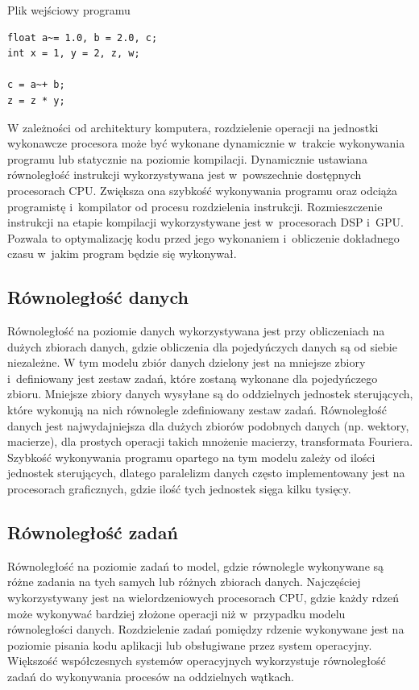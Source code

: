 \begin{program}
\caption{Plik wejściowy programu}
\begin{lstlisting}
float a~= 1.0, b = 2.0, c;
int x = 1, y = 2, z, w;

c = a~+ b;
z = z * y;
\end{lstlisting}
\end{program}

W zależności od architektury komputera, rozdzielenie operacji na jednostki wykonawcze procesora może być wykonane dynamicznie w~trakcie wykonywania programu lub statycznie na poziomie kompilacji. Dynamicznie ustawiana równoległość instrukcji wykorzystywana jest w~powszechnie dostępnych procesorach CPU. Zwiększa ona szybkość wykonywania programu oraz odciąża programistę i~kompilator od procesu rozdzielenia instrukcji. Rozmieszczenie instrukcji na etapie kompilacji wykorzystywane jest w~procesorach DSP i~GPU. Pozwala to optymalizację kodu przed jego wykonaniem i~obliczenie dokładnego czasu w~jakim program będzie się wykonywał.  

\subsection{Równoległość danych}\label{sec:datap}

Równoległość na poziomie danych wykorzystywana jest przy obliczeniach na dużych zbiorach danych, gdzie obliczenia dla pojedyńczych danych są od siebie niezależne. W tym modelu zbiór danych dzielony jest na mniejsze zbiory i~definiowany jest zestaw zadań, które zostaną wykonane dla pojedyńczego zbioru. Mniejsze zbiory danych wysyłane są do oddzielnych jednostek sterujących, które wykonują na nich równolegle zdefiniowany zestaw zadań. Równoległość danych jest najwydajniejsza dla dużych zbiorów podobnych danych (np. wektory, macierze), dla prostych operacji takich mnożenie macierzy, transformata Fouriera. Szybkość wykonywania programu opartego na tym modelu zależy od ilości jednostek sterujących, dlatego paralelizm danych często implementowany jest na procesorach graficznych, gdzie ilość tych jednostek sięga kilku tysięcy.

\subsection{Równoległość zadań}\label{sec:taskp}

Równoległość na poziomie zadań to model, gdzie równolegle wykonywane są różne zadania na tych samych lub różnych zbiorach danych. Najczęściej wykorzystywany jest na wielordzeniowych procesorach CPU, gdzie każdy rdzeń może wykonywać bardziej złożone operacji niż w~przypadku modelu równoległości danych. Rozdzielenie zadań pomiędzy rdzenie wykonywane jest na poziomie pisania kodu aplikacji lub obsługiwane przez system operacyjny. Większość współczesnych systemów operacyjnych wykorzystuje równoległość zadań do wykonywania procesów na oddzielnych wątkach.


